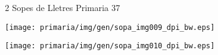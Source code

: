 %
%
\begin{news}
{2} %
{Sopes de Lletres}
{}
{Primaria}
{37} %


\noindent\texttt{[image: primaria/img/gen/sopa\_img009\_dpi\_bw.eps]}

\noindent\texttt{[image: primaria/img/gen/sopa\_img010\_dpi\_bw.eps]}
  
\end{news}
